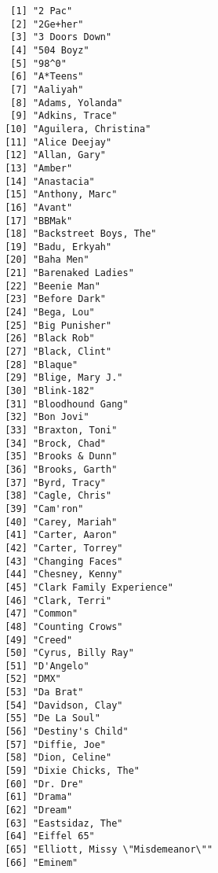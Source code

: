 \documentclass[
  letterpaper,
  DIV=11,
  numbers=noendperiod]{scrreprt}
\begin{document}
\begin{itemize}
\begin{verbatim}
  [1] "2 Pac"                         
  [2] "2Ge+her"                       
  [3] "3 Doors Down"                  
  [4] "504 Boyz"                      
  [5] "98^0"                          
  [6] "A*Teens"                       
  [7] "Aaliyah"                       
  [8] "Adams, Yolanda"                
  [9] "Adkins, Trace"                 
 [10] "Aguilera, Christina"           
 [11] "Alice Deejay"                  
 [12] "Allan, Gary"                   
 [13] "Amber"                         
 [14] "Anastacia"                     
 [15] "Anthony, Marc"                 
 [16] "Avant"                         
 [17] "BBMak"                         
 [18] "Backstreet Boys, The"          
 [19] "Badu, Erkyah"                  
 [20] "Baha Men"                      
 [21] "Barenaked Ladies"              
 [22] "Beenie Man"                    
 [23] "Before Dark"                   
 [24] "Bega, Lou"                     
 [25] "Big Punisher"                  
 [26] "Black Rob"                     
 [27] "Black, Clint"                  
 [28] "Blaque"                        
 [29] "Blige, Mary J."                
 [30] "Blink-182"                     
 [31] "Bloodhound Gang"               
 [32] "Bon Jovi"                      
 [33] "Braxton, Toni"                 
 [34] "Brock, Chad"                   
 [35] "Brooks & Dunn"                 
 [36] "Brooks, Garth"                 
 [37] "Byrd, Tracy"                   
 [38] "Cagle, Chris"                  
 [39] "Cam'ron"                       
 [40] "Carey, Mariah"                 
 [41] "Carter, Aaron"                 
 [42] "Carter, Torrey"                
 [43] "Changing Faces"                
 [44] "Chesney, Kenny"                
 [45] "Clark Family Experience"       
 [46] "Clark, Terri"                  
 [47] "Common"                        
 [48] "Counting Crows"                
 [49] "Creed"                         
 [50] "Cyrus, Billy Ray"              
 [51] "D'Angelo"                      
 [52] "DMX"                           
 [53] "Da Brat"                       
 [54] "Davidson, Clay"                
 [55] "De La Soul"                    
 [56] "Destiny's Child"               
 [57] "Diffie, Joe"                   
 [58] "Dion, Celine"                  
 [59] "Dixie Chicks, The"             
 [60] "Dr. Dre"                       
 [61] "Drama"                         
 [62] "Dream"                         
 [63] "Eastsidaz, The"                
 [64] "Eiffel 65"                     
 [65] "Elliott, Missy \"Misdemeanor\""
 [66] "Eminem"                        

\end{verbatim}
\end{itemize}
\end{document}
